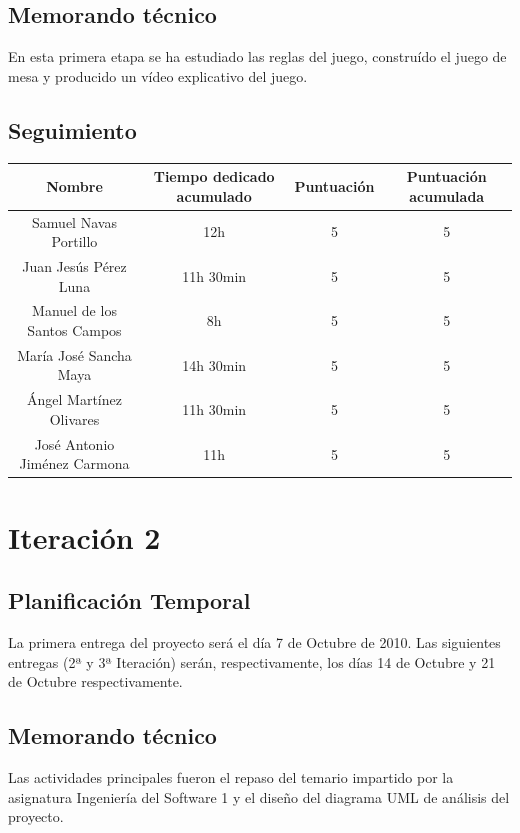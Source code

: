 \documentclass[11 pt]{book}
\begin{document}
	\section{Memorando técnico}
		En esta primera etapa se ha estudiado las reglas del juego, construído el juego de mesa y producido un vídeo explicativo del juego.
	
	\section{Seguimiento}
		\begin{tabular}{|c|c|c|c|}
			\hline
			Nombre & Tiempo dedicado acumulado & Puntuación & Puntuación acumulada\\
			\hline
			Samuel Navas Portillo & 12h & 5 & 5\\
			Juan Jesús Pérez Luna & 11h 30min & 5 & 5\\
			Manuel de los Santos Campos & 8h & 5 & 5\\
			María José Sancha Maya & 14h 30min & 5 & 5\\
			Ángel Martínez Olivares & 11h 30min & 5 & 5\\
			José Antonio Jiménez Carmona & 11h & 5 & 5\\
			\hline
		\end{tabular}
		
\chapter{Iteración 2}
	\section{Planificación Temporal}
		La primera entrega del proyecto será el día 7 de Octubre de 2010. Las siguientes entregas (2ª y 3ª Iteración) serán, respectivamente, los días 14 de Octubre y 21 de Octubre respectivamente.

	\section{Memorando técnico}
		Las actividades principales fueron el repaso del temario impartido por la asignatura Ingeniería del Software 1 y el diseño del diagrama UML de análisis del proyecto.
		
\end{document}
